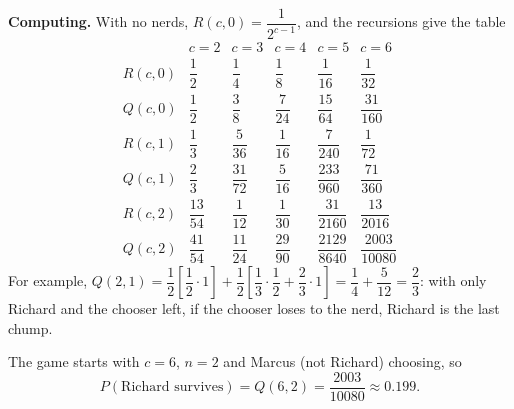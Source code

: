 \textbf{Computing.} With no nerds, $R(c,0)=\dfrac{1}{2^{c-1}}$, and the recursions give the table
\[
\begin{array}{c|ccccc}
 & c=2 & c=3 & c=4 & c=5 & c=6\\\hline
R(c,0) & \dfrac{1}{2} & \dfrac{1}{4} & \dfrac{1}{8} & \dfrac{1}{16} & \dfrac{1}{32}\\[2mm]
Q(c,0) & \dfrac{1}{2} & \dfrac{3}{8} & \dfrac{7}{24} & \dfrac{15}{64} & \dfrac{31}{160}\\[2mm]
R(c,1) & \dfrac{1}{3} & \dfrac{5}{36} & \dfrac{1}{16} & \dfrac{7}{240} & \dfrac{1}{72}\\[2mm]
Q(c,1) & \dfrac{2}{3} & \dfrac{31}{72} & \dfrac{5}{16} & \dfrac{233}{960} & \dfrac{71}{360}\\[2mm]
R(c,2) & \dfrac{13}{54} & \dfrac{1}{12} & \dfrac{1}{30} & \dfrac{31}{2160} & \dfrac{13}{2016}\\[2mm]
Q(c,2) & \dfrac{41}{54} & \dfrac{11}{24} & \dfrac{29}{90} & \dfrac{2129}{8640} & \dfrac{2003}{10080}
\end{array}
\]
For example, $Q(2,1)=\dfrac{1}{2}\left[\dfrac{1}{2}\cdot1\right]+\dfrac{1}{2}\left[\dfrac{1}{3}\cdot\dfrac{1}{2}+\dfrac{2}{3}\cdot1\right]=\dfrac{1}{4}+\dfrac{5}{12}=\dfrac{2}{3}$: with only Richard and the chooser left, if the chooser loses to the nerd, Richard is the last chump.

The game starts with $c=6$, $n=2$ and Marcus (not Richard) choosing, so
\[
P(\text{Richard survives})=Q(6,2)=\dfrac{2003}{10080}\approx\boxed{0.199}.
\]
